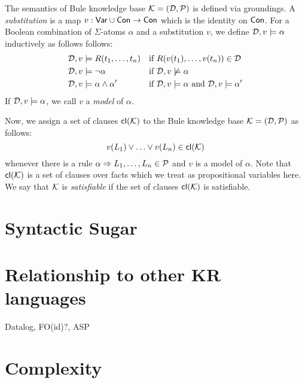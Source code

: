 \documentclass{article}
\begin{document}
The semantics of Bule knowledge base $\mathcal{K}=(\mathcal{D},\mathcal{P})$ is defined via
groundings. A \emph{substitution} is a map
$v:\mathsf{Var}\cup\mathsf{Con}\to\mathsf{Con}$ which is the identity on
$\mathsf{Con}$. For a Boolean combination of $\Sigma$-atoms $\alpha$ and a
substitution $v$, we define $\mathcal{D},v\models \alpha$ inductively as
follows follows: 
%
\begin{align*}
  \mathcal{D},v & \models R(t_1,\ldots,t_n) && \text{if
  $R(v(t_1),\ldots,v(t_n))\in \mathcal{D}$} \\
  \mathcal{D}, v& \models \neg \alpha && \text{if $\mathcal{D},v\not\models \alpha$}
  \\
  \mathcal{D}, v& \models \alpha \wedge \alpha' && \text{if $\mathcal{D},v\models
  \alpha$ and $\mathcal{D},v\models\alpha'$}
\end{align*}
%
If $\mathcal{D},v\models\alpha$, we call $v$ a \emph{model} of $\alpha$.

Now, we assign a set of clauses $\mathsf{cl}(\mathcal{K})$ to the Bule knowledge
base $\mathcal{K}=(\mathcal{D},\mathcal{P})$ as follows:
%
\[v(L_1)\vee\ldots\vee v(L_n)\in \mathsf{cl}(\mathcal{K})\]
%
whenever there is a rule $\alpha \Rightarrow L_1,\ldots,L_n\in\mathcal{P}$ and $v$ is a
model of $\alpha$. Note that $\mathsf{cl}(\mathcal{K})$ is a set of clauses over
facts which we treat as propositional variables here.  We say that
$\mathcal{K}$ is \emph{satisfiable} if the set of clauses $\mathsf{cl}(\mathcal{K})$ is
satisfiable. 

\section{Syntactic Sugar}

\section{Relationship to other KR languages}

Datalog, FO(id)?, ASP

\section{Complexity}
\end{document}
